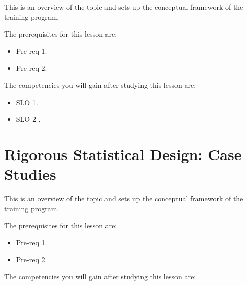 This is an overview of the topic and sets up the conceptual framework of the training program.




The prerequisites for this lesson are: 




\begin{itemize}
    \item Pre-req 1.
\end{itemize}

\begin{itemize}
    \item Pre-req 2.
\end{itemize}




The competencies you will gain after studying this lesson are: 




\begin{itemize}
    \item SLO 1.
\end{itemize}

\begin{itemize}
    \item SLO 2 .
\end{itemize}

\section{Rigorous Statistical Design: Case Studies}
\label{sec:rigorous-statistical-design-case-studies}

This is an overview of the topic and sets up the conceptual framework of the training program.




The prerequisites for this lesson are: 




\begin{itemize}
    \item Pre-req 1.
\end{itemize}

\begin{itemize}
    \item Pre-req 2.
\end{itemize}




The competencies you will gain after studying this lesson are: 




